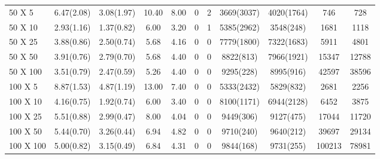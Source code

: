 \begin{table*}[htb]
\begin{tabularx}{430pt}{X*{10}{c}}
\midrule
50 X 5 & 6.47(2.08) & 3.08(1.97) & 10.40 & 8.00 & 0 & 2 & 3669(3037) & 4020(1764) & 746 & 728 \\
50 X 10 & 2.93(1.16) & 1.37(0.82) & 6.00 & 3.20 & 0 & 1 & 5385(2962) & 3548(248) & 1681 & 1118 \\
50 X 25 & 3.88(0.86) & 2.50(0.74) & 5.68 & 4.16 & 0 & 0 & 7779(1800) & 7322(1683) & 5911 & 4801 \\
50 X 50 & 3.91(0.76) & 2.79(0.70) & 5.68 & 4.40 & 0 & 0 & 8822(813) & 7966(1921) & 15347 & 12788 \\
50 X 100 & 3.51(0.79) & 2.47(0.59) & 5.26 & 4.40 & 0 & 0 & 9295(228) & 8995(916) & 42597 & 38596 \\
\midrule
100 X 5 & 8.87(1.53) & 4.87(1.19) & 13.00 & 7.40 & 0 & 0 & 5333(2432) & 5829(832) & 2681 & 2256 \\
100 X 10 & 4.16(0.75) & 1.92(0.74) & 6.00 & 3.40 & 0 & 0 & 8100(1171) & 6944(2128) & 6452 & 3875 \\
100 X 25 & 5.51(0.88) & 2.99(0.47) & 8.00 & 4.04 & 0 & 0 & 9449(306) & 9127(475) & 17044 & 11720 \\
100 X 50 & 5.44(0.70) & 3.26(0.44) & 6.94 & 4.82 & 0 & 0 & 9710(240) & 9640(212) & 39697 & 29134 \\
100 X 100 & 5.00(0.82) & 3.15(0.49) & 6.84 & 4.31 & 0 & 0 & 9844(168) & 9731(255) & 100213 & 78981 \\
\bottomrule
\end{tabularx}
\end{table*}




